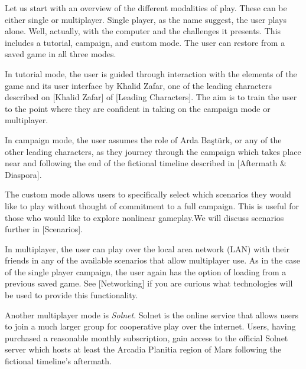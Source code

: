 

Let us start with an overview of the different modalities of play. These can be either single or multiplayer. Single player, as the name suggest, the user plays alone. Well, actually, with the computer and the challenges it presents. This includes a tutorial, campaign, and custom mode. The user can restore from a saved game in all three modes.

In tutorial mode, the user is guided through interaction with the elements of the game and its user interface by Khalid Zafar, one of the leading characters described on [Khalid Zafar] of [Leading Characters]. The aim is to train the user to the point where they are confident in taking on the campaign mode or multiplayer.

In campaign mode, the user assumes the role of Arda Baştürk, or any of the other leading characters, as they journey through the campaign which takes place near and following the end of the fictional timeline described in [Aftermath & Diaspora].

The custom mode allows users to specifically select which scenarios they would like to play without thought of commitment to a full campaign. This is useful for those who would like to explore nonlinear gameplay.We will discuss scenarios further in [Scenarios]. 

In multiplayer, the user can play over the local area network (LAN) with their friends in any of the available scenarios that allow multiplayer use. As in the case of the single player campaign, the user again has the option of loading from a previous saved game. See [Networking] if you are curious what technologies will be used to provide this functionality.

Another multiplayer mode is {\it Solnet}. Solnet is the online service that allows users to join a much larger group for cooperative play over the internet. Users, having purchased a reasonable monthly subscription, gain access to the official Solnet server which hosts at least the Arcadia Planitia region of Mars following the fictional timeline's aftermath. 

